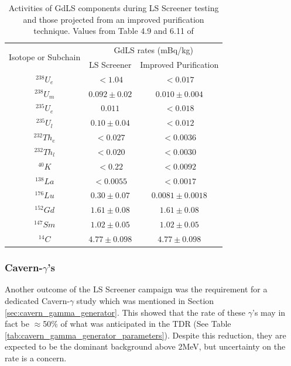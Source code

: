 \begin{table}[!htbp]
    \centering
    \begin{tabular}{c|c|c}
        \multirow{2}{*}{Isotope or Subchain}  &  \multicolumn{2}{c}{GdLS rates (mBq/kg)}      \\ 
                             &  LS Screener          & Improved Purification \\ \hline
        ${}^{238}U_{e}$      &  $< 1.04$             & $< 0.017$             \\ 
        ${}^{238}U_{m}$      &  $0.092\pm0.02$       & $0.010\pm0.004$       \\
        ${}^{235}U_{e}$      &  $0.011$              & $< 0.018$             \\
        ${}^{235}U_{l}$      &  $0.10\pm0.04$        & $< 0.012$             \\
        ${}^{232}Th_{e}$     &  $< 0.027$            & $< 0.0036$            \\
        ${}^{232}Th_{l}$     &  $< 0.020$            & $< 0.0030$            \\
        ${}^{40}K$           &  $< 0.22$             & $< 0.0092$            \\
        ${}^{138}La$         &  $< 0.0055$           & $< 0.0017$            \\
        ${}^{176}Lu$         &  $0.30\pm0.07$        & $0.0081\pm0.0018$     \\
        ${}^{152}{Gd}$       &  $1.61\pm0.08$        & $1.61\pm0.08$         \\
        ${}^{147}{Sm}$       &  $1.02\pm0.05$        & $1.02\pm0.05$         \\
        ${}^{14}{C}$         &  $4.77\pm0.098$       & $4.77\pm0.098$ 
    \end{tabular}
    \caption{Activities of GdLS components during LS Screener testing and those projected from an improved purification technique. Values from Table 4.9 and 6.11 of \cite{scotthaselschwardt_thesis_ref}}
    \label{tab:gdls_assay_rates}
\end{table}




\subsubsection{Cavern-$\gamma$'s}
\par
Another outcome of the LS Screener campaign was the requirement for a dedicated Cavern-$\gamma$ study which was mentioned in Section \ref{sec:cavern_gamma_generator}.
This showed that the rate of these $\gamma$'s may in fact be $\approx$50\% of what was anticipated in the TDR \cite{LZ_TechnicalDesignReview_ref} (See Table \ref{tab:cavern_gamma_generator_parameters}).
Despite this reduction, they are expected to be the dominant background above 2MeV, but uncertainty on the rate is a concern.

